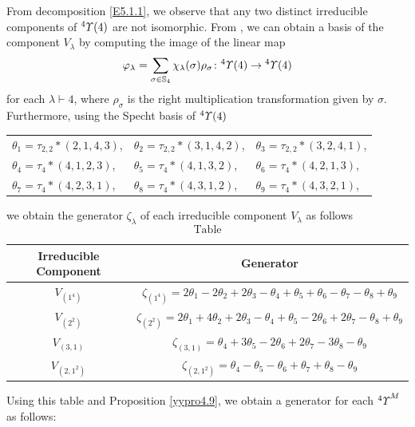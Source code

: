 \documentclass{amsart}
\theoremstyle{definition}
\theoremstyle{remark}
\numberwithin{equation}{section}
\def\S{\mathbb{S}}
\newcommand{\up}[1]{{^{#1}{\it \!\Upsilon}}}
\def\la{\lambda}
\def \S{\mathbb{S}}
\begin{document}
From decomposition \eqref{E5.1.1}, we observe that any two 
distinct irreducible components of $\up{4}(4)$ are not 
isomorphic. From \cite[Theorem 3.6.2]{We}, we can obtain 
a basis of the component $V_{\la}$ by computing the image 
of the linear map 
\[\varphi_{\lambda}=\sum_{\sigma\in \S_4} 
\chi_{\lambda}(\sigma)\rho_\sigma\colon \up{4}(4)\to \up{4}(4)\] 
for each $\la\vdash 4$, where $\rho_\sigma$ is the right 
multiplication transformation given by $\sigma$. 
Furthermore, using the Specht basis of $\up{4}(4)$
\begin{center}
\begin{tabular}{lll}
$\theta_1=\tau_{2, 2}\ast (2, 1, 4, 3)$,  & 
$\theta_2=\tau_{2, 2}\ast (3, 1, 4, 2)$, & 
$\theta_3=\tau_{2, 2}\ast (3, 2, 4, 1)$,\\
$\theta_4=\tau_4\ast(4, 1, 2, 3)$, & 
$\theta_5=\tau_4\ast(4, 1, 3, 2)$, & 
$\theta_6=\tau_4\ast(4, 2, 1, 3)$,\\
$\theta_7=\tau_4\ast(4, 2, 3, 1)$, & 
$\theta_8=\tau_4\ast(4, 3, 1, 2)$, & 
$\theta_9=\tau_4\ast(4, 3, 2, 1)$,
\end{tabular}
\end{center}
we obtain the generator $\zeta_{\la}$ of each 
irreducible component $V_{\la}$ as follows
\begin{equation}
\label{E5.4.1}\tag{E5.4.1}
\text{Table}
\end{equation}
\begin{center}
\begin{tabular}{|c|c|}
\hline 
Irreducible Component & Generator\\ \hline
$V_{(1^4)}$ & $\zeta_{(1^4)}=2\theta_1-2\theta_2
+2\theta_3-\theta_4+\theta_5+\theta_6-\theta_7-\theta_8+\theta_9$ \\ \hline
$V_{(2^2)}$ & $\zeta_{(2^2)}=2\theta_1+4\theta_2
+2\theta_3-\theta_4+\theta_5-2\theta_6+2\theta_7
-\theta_8+\theta_9$ \\ \hline
$V_{(3, 1)}$ & $\zeta_{(3, 1)}=\theta_4+3\theta_5
-2\theta_6+2\theta_7-3\theta_8-\theta_9$ \\ \hline
$V_{(2, 1^2)}$ &
$\zeta_{(2, 1^2)}=\theta_4-\theta_5-\theta_6
+\theta_7+\theta_8-\theta_9$ \\ \hline
\end{tabular}
\end{center}


Using this table and Proposition \ref{yypro4.9}, 
we obtain a generator for each $\up{4}^M$ as follows:
\end{document}
